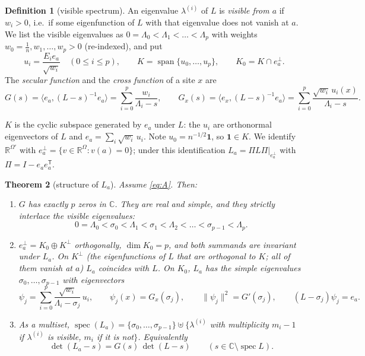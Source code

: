 \documentclass[11pt,a4paper]{article}
\DeclareMathOperator{\spec}{spec}
\DeclareMathOperator{\spn}{span}
\newcommand{\one}{\mathbf 1}
\newcommand{\R}{\mathbb R}
\newcommand{\ip}[2]{\langle #1,#2\rangle}
\theoremstyle{plain}
\newtheorem{theorem}{Theorem}[section]
\theoremstyle{definition}
\newtheorem{definition}[theorem]{Definition}
\numberwithin{equation}{section}
\begin{document}
\begin{definition}[visible spectrum]\label{def:visible}
An eigenvalue $\lambda^{(i)}$ of $L$ is \emph{visible from $a$} if $w_i>0$, i.e.\ if some eigenfunction of $L$ with that eigenvalue does not vanish at $a$. We list the visible eigenvalues as
$0=\Lambda_0<\Lambda_1<\dots<\Lambda_p$ with weights $w_0=\frac1n,w_1,\dots,w_p>0$ (re-indexed), and put
\[
u_i=\frac{E_ie_a}{\sqrt{w_i}}\quad(0\le i\le p),\qquad K=\spn\{u_0,\dots,u_p\},\qquad K_0=K\cap e_a^{\perp}.
\]
The \emph{secular function} and the \emph{cross function} of a site $x$ are
\begin{equation}\label{eq:G}
G(s)=\ip{e_a}{(L-s)^{-1}e_a}=\sum_{i=0}^p\frac{w_i}{\Lambda_i-s},\qquad
G_x(s)=\ip{e_x}{(L-s)^{-1}e_a}=\sum_{i=0}^p\frac{\sqrt{w_i}\,u_i(x)}{\Lambda_i-s}.
\end{equation}
\end{definition}

$K$ is the cyclic subspace generated by $e_a$ under $L$: the $u_i$ are orthonormal eigenvectors of $L$ and $e_a=\sum_i\sqrt{w_i}\,u_i$. Note $u_0=n^{-1/2}\one$, so $\one\in K$. We identify $\R^{\Omega'}$ with $e_a^\perp=\{v\in\R^\Omega:v(a)=0\}$; under this identification $L_a=\Pi L\Pi|_{e_a^\perp}$ with $\Pi=I-e_ae_a^{\mathsf T}$.

\begin{theorem}[structure of $L_a$]\label{thm:structure}
Assume \eqref{eq:A}. Then:
\begin{enumerate}
\item[(i)] $G$ has exactly $p$ zeros in $\mathbb C$. They are real and simple, and they strictly interlace the visible eigenvalues:
\begin{equation}\label{eq:strict}
0=\Lambda_0<\sigma_0<\Lambda_1<\sigma_1<\Lambda_2<\dots<\sigma_{p-1}<\Lambda_p .
\end{equation}
\item[(ii)] $e_a^\perp=K_0\oplus K^\perp$ orthogonally, $\dim K_0=p$, and both summands are invariant under $L_a$. On $K^\perp$ (the eigenfunctions of $L$ that are orthogonal to $K$; all of them vanish at $a$) $L_a$ coincides with $L$. On $K_0$, $L_a$ has the simple eigenvalues $\sigma_0,\dots,\sigma_{p-1}$ with eigenvectors
\begin{equation}\label{eq:psi}
\psi_j=\sum_{i=0}^p\frac{\sqrt{w_i}}{\Lambda_i-\sigma_j}\,u_i,\qquad \psi_j(x)=G_x(\sigma_j),\qquad \|\psi_j\|^2=G'(\sigma_j),\qquad (L-\sigma_j)\psi_j=e_a .
\end{equation}
\item[(iii)] As a multiset, $\spec(L_a)=\{\sigma_0,\dots,\sigma_{p-1}\}\uplus\{\lambda^{(i)}$ with multiplicity $m_i-1$ if $\lambda^{(i)}$ is visible, $m_i$ if it is not$\}$. Equivalently
\begin{equation}\label{eq:det}
\det(L_a-s)=G(s)\,\det(L-s)\qquad(s\in\mathbb C\setminus\spec L).
\end{equation}
\end{enumerate}
\end{theorem}
\end{document}
